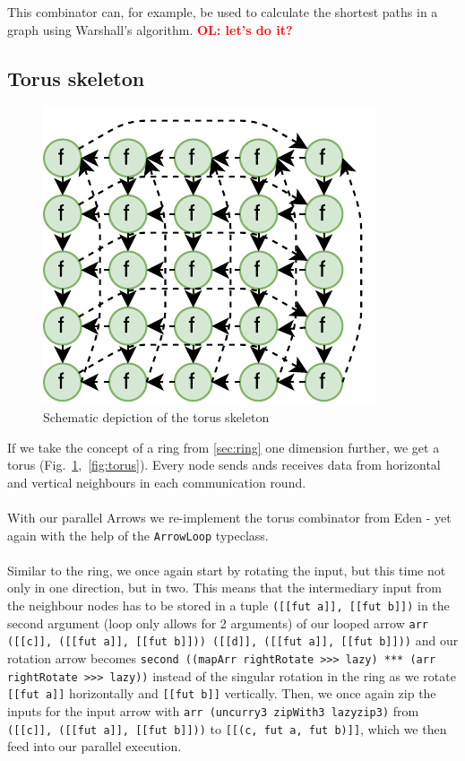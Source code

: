 \documentclass{jfp1}
\renewcommand{\cite}[1]{\citep{#1}}
\newcommand{\inlinecode}[1]{\texttt{#1}}
\newcommand{\comm}[2]{\textcolor{red}{\bfseries #1: #2}}
\newcommand{\olcomment}[1]{\comm{OL}{#1}}
\begin{document}
This combinator can, for example, be used to calculate the shortest paths in a graph using Warshall's algorithm.
\olcomment{let's do it?}
\subsection{Torus skeleton}
\begin{figure}
	\includegraphics[scale=0.75]{images/torus}
	\caption{Schematic depiction of the torus skeleton}
	\label{fig:ringTorusImg}
\end{figure}
If we take the concept of a ring from \ref{sec:ring} one dimension further, we get a torus (Fig.~\ref{fig:ringTorusImg},~\ref{fig:torus}). Every node sends ands receives data from horizontal and vertical neighbours in each communication round.
\\\\
With our parallel Arrows we re-implement the torus combinator from Eden \citep{eden_skel_topology} - yet again with the help of the \inlinecode{ArrowLoop} typeclass.
\\\\
Similar to the ring, we once again start by rotating the input, but this time not only in one direction, but in two. This means that the intermediary input from the neighbour nodes has to be stored in a tuple \inlinecode{([[fut a]], [[fut b]])} in the second argument (loop only allows for 2 arguments) of our looped arrow \inlinecode{arr ([[c]], ([[fut a]], [[fut b]])) ([[d]], ([[fut a]], [[fut b]]))} and our rotation arrow becomes \inlinecode{second ((mapArr rightRotate >>> lazy) *** (arr rightRotate >>> lazy))} instead of the singular rotation in the ring as we rotate \inlinecode{[[fut a]]} horizontally and \inlinecode{[[fut b]]} vertically. Then, we once again zip the inputs for the input arrow with \inlinecode{arr (uncurry3 zipWith3 lazyzip3)} from \inlinecode{([[c]], ([[fut a]], [[fut b]]))} to \inlinecode{[[(c, fut a, fut b)]]}, which we then feed into our parallel execution.
\end{document}
